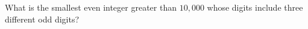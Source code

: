 What is the smallest even integer greater than $10{,}000$ whose digits include three different odd digits?
